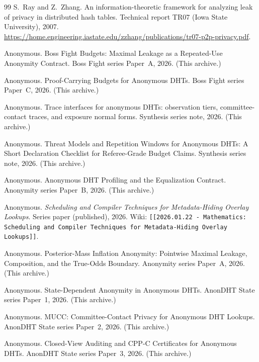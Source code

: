 \documentclass[11pt]{article}
\begin{document}
\begin{thebibliography}{99}
S.~Ray and Z.~Zhang.
\newblock An information-theoretic framework for analyzing leak of privacy in distributed hash tables.
\newblock Technical report TR07 (Iowa State University), 2007. \url{https://home.engineering.iastate.edu/zzhang/publications/tr07-p2p-privacy.pdf}.

Anonymous.
\newblock Boss Fight Budgets: Maximal Leakage as a Repeated-Use Anonymity Contract.
\newblock Boss Fight series Paper~A, 2026. (This archive.)

Anonymous.
\newblock Proof-Carrying Budgets for Anonymous DHTs.
\newblock Boss Fight series Paper~C, 2026. (This archive.)


Anonymous.
\newblock Trace interfaces for anonymous DHTs: observation tiers, committee-contact traces, and exposure normal forms.
\newblock Synthesis series note, 2026. (This archive.)

Anonymous.
\newblock Threat Models and Repetition Windows for Anonymous DHTs: A Short Declaration Checklist for Referee-Grade Budget Claims.
\newblock Synthesis series note, 2026. (This archive.)

Anonymous.
\newblock Anonymous DHT Profiling and the Equalization Contract.
\newblock Anonymity series Paper~B, 2026. (This archive.)


Anonymous.
\newblock \emph{Scheduling and Compiler Techniques for Metadata-Hiding Overlay Lookups}.
\newblock Series paper (published), 2026.
\newblock Wiki: \texttt{[[2026.01.22 - Mathematics: Scheduling and Compiler Techniques for Metadata-Hiding Overlay Lookups]]}.


Anonymous.
\newblock Posterior-Mass Inflation Anonymity: Pointwise Maximal Leakage, Composition, and the True-Odds Boundary.
\newblock Anonymity series Paper~A, 2026. (This archive.)

Anonymous.
\newblock State-Dependent Anonymity in Anonymous DHTs.
\newblock AnonDHT State series Paper~1, 2026. (This archive.)

Anonymous.
\newblock MUCC: Committee-Contact Privacy for Anonymous DHT Lookups.
\newblock AnonDHT State series Paper~2, 2026. (This archive.)

Anonymous.
\newblock Closed-View Auditing and CPP-C Certificates for Anonymous DHTs.
\newblock AnonDHT State series Paper~3, 2026. (This archive.)


\end{thebibliography}
\end{document}
